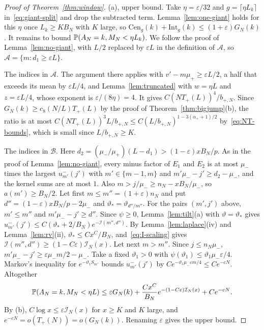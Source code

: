\begin{proof}[Proof of Theorem~\ref{thm:window}]
(a), upper bound. Take $\eta=\varepsilon/32$ and $g=\lceil\eta L_k\rceil$
in~\eqref{eq:giant-split} and drop the subtracted term. Lemma~\ref{lem:one-giant} holds for
this $\eta$ once $L_k\ge KB_N$ with $K$ large, so
$\mathrm{Cen}_g(k)+\mathrm{Int}_g(k)\le(1+\varepsilon)G_N(k)$. It remains to bound
$\mathbb{P}(A_N=k,M_N<\eta L_k)$. We follow the proof of Lemma~\ref{lem:no-giant}, with $L/2$
replaced by $\varepsilon L$ in the definition of $\mathcal A$, so
$\mathcal A=\{m:d_1\ge\varepsilon L\}$.

The indices in $\mathcal A$. The argument there applies with $v'-m\mu_\plus\ge\varepsilon L/2$, a
half that exceeds its mean by $\varepsilon L/4$, and Lemma~\ref{lem:truncated} with $w=\eta L$
and $z=\varepsilon L/4$, whose exponent is $\varepsilon/(8\eta)=4$. It gives
$C(NT_\plus(L))^4/b_{\plus,N}$. Since $G_N(k)\ge c_8(N/L)T_\plus(L)$ by the proof of
Theorem~\ref{thm:bigjump}(b), the ratio is at most
$C(NT_\plus(L))^3L/b_{\plus,N}\le C(L/b_{\plus,N})^{1-3(\alpha_\plus+1)/2}$
by~\eqref{eq:NT-bounds}, which is small since $L/b_{\plus,N}\ge K$.

The indices in $\mathcal B$. Here
$d_2=(\mu_\minus/\mu_\plus)(L-d_1)>(1-\varepsilon)xB_N/p$. As in the proof of
Lemma~\ref{lem:no-giant}, every minus factor of $E_1$ and $E_2$ is at most $\mu_\minus$ times
the largest $u^\minus_{m'}(j')$ with $m'\in\{m-1,m\}$ and $m'\mu_\minus-j'\ge d_2-\mu_\minus$, and
the kernel sums are at most $1$. Also $m>j/\mu_\minus\ge n_N-xB_N/\mu_\minus$, so
$a(m')\ge B_N/2$. Let first $m\le m''=(1+\varepsilon)n_N$ and put
$d''=(1-\varepsilon)xB_N/p-2\mu_\minus$ and $\vartheta_*=\vartheta_{d''/m''}$. For the pairs
$(m',j')$ above, $m'\le m''$ and $m'\mu_\minus-j'\ge d''$. Since $\psi\ge0$,
Lemma~\ref{lem:tilt}(a) with $\vartheta=\vartheta_*$ gives
$u^\minus_{m'}(j')\le C(\vartheta_*+2/B_N)e^{-\mathcal I(m'',d'')}$. By
Lemma~\ref{lem:laplace}(iv) and Lemma~\ref{lem:rv}(ii), $\vartheta_*\le Cx^C/B_N$,
and~\eqref{eq:I-scaling} gives $\mathcal I(m'',d'')\ge(1-C\varepsilon)\mathcal I_N(x)$. Let next
$m>m''$. Since $j\le n_N\mu_\minus$, $m'\mu_\minus-j'\ge\varepsilon\mu_\minus m/2-\mu_\minus$.
Take a fixed $\vartheta_1>0$ with $\psi(\vartheta_1)\le\vartheta_1\mu_\minus\varepsilon/4$. Markov's
inequality for $e^{-\vartheta_1S_{m'}}$ bounds $u^\minus_{m'}(j')$ by
$Ce^{-\vartheta_1\mu_\minus\varepsilon m/4}\le Ce^{-cN}$. Altogether
\[
 \mathbb{P}(A_N=k,M_N<\eta L)\le\varepsilon G_N(k)+\frac{Cx^C}{B_N}e^{-(1-C\varepsilon)\mathcal I_N(x)}+Ce^{-cN}.
\]
By (b), $C\log x\le\varepsilon\mathcal I_N(x)$ for $x\ge K$ and $K$ large, and
$e^{-cN}=o(T_\plus(N))=o(G_N(k))$. Renaming $\varepsilon$ gives the upper bound.


\end{proof}
